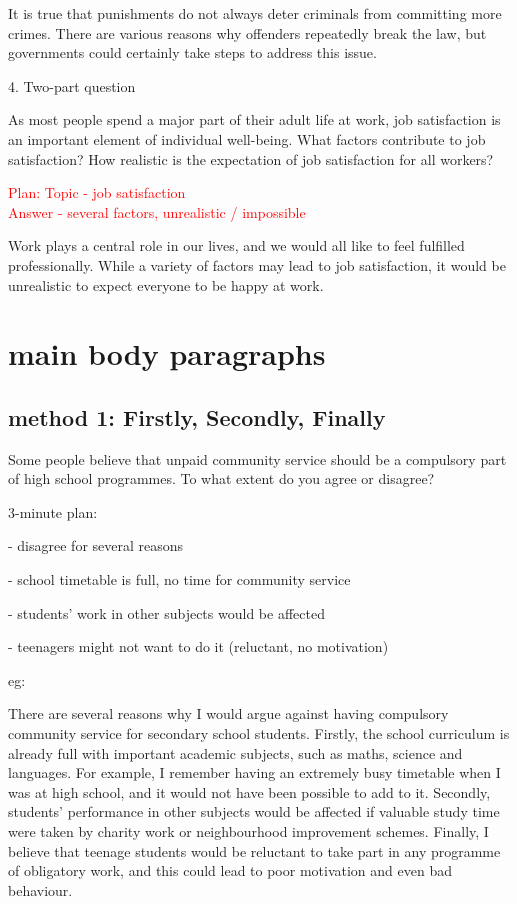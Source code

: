 \documentclass[12pt,a4paper]{article}
\newcommand{\textred}[1]{\textcolor{red}{#1}}  %
\begin{document}
It is true that punishments do not always deter criminals from committing more crimes. There are various reasons why offenders repeatedly break the law, but governments could certainly take steps to address this issue.




4. Two-part question

As most people spend a major part of their adult life at work, job satisfaction is an important element of individual well-being. What factors contribute to job satisfaction? How realistic is the expectation of job satisfaction for all workers?

{\small \textred{Plan:  Topic - job satisfaction\\
\hspace*{4.4em} Answer - several factors, unrealistic / impossible}}

Work plays a central role in our lives, and we would all like to feel fulfilled professionally. While a variety of factors may lead to job satisfaction, it would be unrealistic to expect everyone to be happy at work.


\newpage
\section{main body paragraphs}
\subsection{method 1: Firstly, Secondly, Finally}

Some people believe that unpaid community service should be a compulsory part of high school programmes.
To what extent do you agree or disagree?

3-minute plan:

- disagree for several reasons

- school timetable is full, no time for community service

- students' work in other subjects would be affected

- teenagers might not want to do it (reluctant, no motivation)

eg:

There are several reasons why I would argue against having compulsory community service for secondary school students.
Firstly, the school curriculum is already full with important academic subjects, such as maths, science and languages.
For example, I remember having an extremely busy timetable when I was at high school, and it would not have been possible to add to it.
Secondly, students' performance in other subjects would be affected if valuable study time were taken by charity work or neighbourhood improvement schemes.
Finally, I believe that teenage students would be reluctant to take part in any programme of obligatory work, and this could lead to poor motivation and even bad behaviour.
\end{document}
